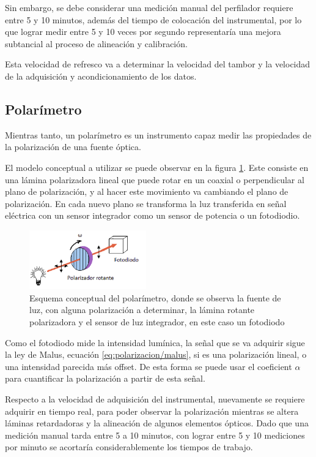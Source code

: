 Sin embargo, se debe considerar una medición manual del perfilador requiere entre 5 y 10 minutos, además del tiempo de colocación del instrumental, por lo que lograr medir entre 5 y 10 veces por segundo representaría una mejora subtancial al proceso de alineación y calibración.

Esta velocidad de refresco va a determinar la velocidad del tambor y la velocidad de la adquisición y acondicionamiento de los datos.

\subsection{Polarímetro}

Mientras tanto, un polarímetro es un instrumento capaz medir las propiedades de la polarización de una fuente óptica.

El modelo conceptual a utilizar se puede observar en la figura \ref{fig:polarimetro/esquema}. Este consiste en una lámina polarizadora lineal que puede rotar en un coaxial o perpendicular al plano de polarización, y al hacer este movimiento va cambiando el plano de polarización. En cada nuevo plano se transforma la luz transferida en señal eléctrica con un sensor integrador como un sensor de potencia o un fotodiodio. 

\begin{figure}[H]
    \centering
    \includegraphics[width=0.45\textwidth]{fig/polarimetro/esquema}
    \caption{Esquema conceptual del polarímetro, donde se observa la fuente de luz, con alguna polarización a determinar, la lámina rotante polarizadora y el sensor de luz integrador, en este caso un fotodiodo}
    \label{fig:polarimetro/esquema}
\end{figure}

Como el fotodiodo mide la intensidad lumínica, la señal que se va adquirir sigue la ley de Malus, ecuación \ref{eq:polarizacion/malus}, si es una polarización lineal, o una intensidad parecida más offset. De esta forma se puede usar el coeficient $\alpha$ para cuantificar la polarización a partir de esta señal.

Respecto a la velocidad de adquisición del instrumental, nuevamente se requiere adquirir en tiempo real, para poder observar la polarización mientras se altera láminas retardadoras y la alineación de algunos elementos ópticos. Dado que una medición manual tarda entre 5 a 10 minutos, con lograr entre 5 y 10 mediciones por minuto se acortaría considerablemente los tiempos de trabajo.

